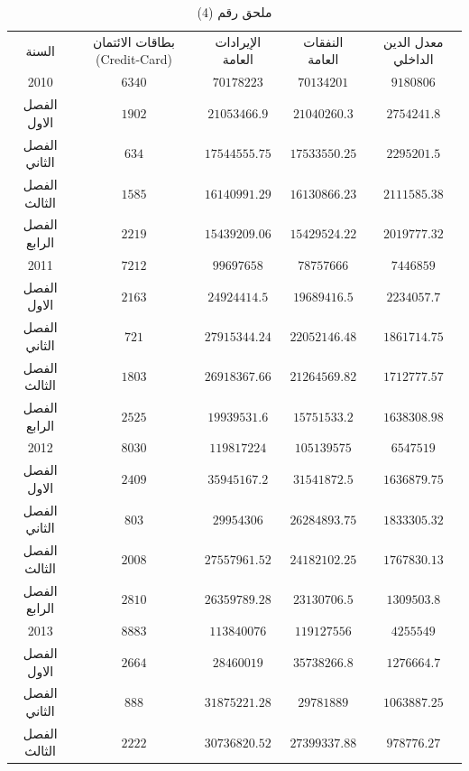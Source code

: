 \documentclass[10pt,a4paper]{report}
\begin{document}
	\begin{longtable}{|c|c|c|c|c|}
	\captionsetup{font=Large}
	\caption*{ملحق رقم (4)} \\
	\hline
	\rowcolor[HTML]{DAE8FC} 
	السنة & بطاقات الائتمان   (Credit-Card) & الإيرادات العامة & النفقات العامة & معدل الدين الداخلي \\ \hline
	2010         & $6340$  & $70178223$    & $70134201$    & $9180806$     \\ \hline
	الفصل الاول  & $1902$  & $21053466.9$  & $21040260.3$  & $2754241.8$   \\ \hline
	الفصل الثاني & $634$   & $17544555.75$ & $17533550.25$ & $2295201.5$   \\ \hline
	الفصل الثالث & $1585$  & $16140991.29$ & $16130866.23$ & $2111585.38$  \\ \hline
	الفصل الرابع & $2219$  & $15439209.06$ & $15429524.22$ & $2019777.32$  \\ \hline
	2011         & $7212$  & $99697658$    & $78757666$    & $7446859$     \\ \hline
	الفصل الاول  & $2163$  & $24924414.5$  & $19689416.5$  & $2234057.7$   \\ \hline
	الفصل الثاني & $721$   & $27915344.24$ & $22052146.48$ & $1861714.75$  \\ \hline
	الفصل الثالث & $1803$  & $26918367.66$ & $21264569.82$ & $1712777.57$  \\ \hline
	الفصل الرابع & $2525$  & $19939531.6$  & $15751533.2$  & $1638308.98$  \\ \hline
	2012         & $8030$  & $119817224$   & $105139575$   & $6547519$     \\ \hline
	الفصل الاول  & $2409$  & $35945167.2$  & $31541872.5$  & $1636879.75$  \\ \hline
	الفصل الثاني & $803$   & $29954306$    & $26284893.75$ & $1833305.32$  \\ \hline
	الفصل الثالث & $2008$  & $27557961.52$ & $24182102.25$ & $1767830.13$  \\ \hline
	الفصل الرابع & $2810$  & $26359789.28$ & $23130706.5$  & $1309503.8$   \\ \hline
	2013         & $8883$  & $113840076$   & $119127556$   & $4255549$     \\ \hline
	الفصل الاول  & $2664$  & $28460019$    & $35738266.8$  & $1276664.7$   \\ \hline
	الفصل الثاني & $888$   & $31875221.28$ & $29781889$    & $1063887.25$  \\ \hline
	الفصل الثالث & $2222$  & $30736820.52$ & $27399337.88$ & $978776.27$   \\ \hline

\end{longtable}
\end{document}
